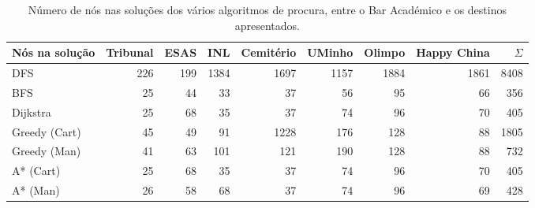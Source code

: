 \documentclass[12pt, a4paper, titlepage]{article}
\begin{document}
\begin{table}[H]
    \small

    \begin{adjustwidth}{-1.5cm}{-1.5cm}
        \begin{center}
            \begin{tabular}{|l|r|r|r|r|r|r|r|r|}
                \hline
                    Nós na solução &
                    Tribunal       &
                    ESAS           &
                    INL            &
                    Cemitério      &
                    UMinho         &
                    Olimpo         &
                    Happy China    &
                    $\Sigma$       \\

                \hline
                DFS & 226 & 199 & 1384 & 1697 & 1157 & 1884 & 1861 & 8408 \\
                \hline
                BFS & 25 & 44 & 33 & 37 & 56 & 95 & 66 & 356 \\
                \hline
                Dijkstra & 25 & 68 & 35 & 37 & 74 & 96 & 70 & 405 \\
                \hline
                Greedy (Cart) & 45 & 49 & 91 & 1228 & 176 & 128 & 88 & 1805 \\
                \hline
                Greedy (Man) & 41 & 63 & 101 & 121 & 190 & 128 & 88 & 732 \\
                \hline
                A* (Cart) & 25 & 68 & 35 & 37 & 74 & 96 & 70 & 405 \\
                \hline
                A* (Man) & 26 & 58 & 68 & 37 & 74 & 96 & 69 & 428 \\
                \hline
            \end{tabular}
        \end{center}
    \end{adjustwidth}

    \caption{
        Número de nós nas soluções dos vários algoritmos de procura, entre o Bar Académico e os
        destinos apresentados.
    }
\end{table}
\end{document}
